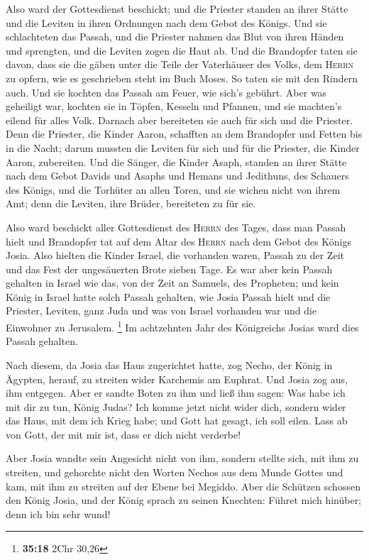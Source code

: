  Also ward der Gottesdienst beschickt; und die Priester
standen an ihrer Stätte und die Leviten in ihren Ordnungen nach dem
Gebot des Königs.  Und sie schlachteten das Passah, und
die Priester nahmen das Blut von ihren Händen und sprengten, und die
Leviten zogen die Haut ab.  Und die Brandopfer taten sie
davon, dass sie die gäben unter die Teile der Vaterhäuser des Volks, dem
\textsc{Herrn} zu opfern, wie es geschrieben steht im Buch Moses. So
taten sie mit den Rindern auch.  Und sie kochten das
Passah am Feuer, wie sich's gebührt. Aber was geheiligt war, kochten sie
in Töpfen, Kesseln und Pfannen, und sie machten's eilend für alles Volk.
 Darnach aber bereiteten sie auch für sich und die
Priester. Denn die Priester, die Kinder Aaron, schafften an dem
Brandopfer und Fetten bis in die Nacht; darum mussten die Leviten für
sich und für die Priester, die Kinder Aaron, zubereiten. 
Und die Sänger, die Kinder Asaph, standen an ihrer Stätte nach dem Gebot
Davids und Asaphs und Hemans und Jedithuns, des Schauers des Königs, und
die Torhüter an allen Toren, und sie wichen nicht von ihrem Amt; denn
die Leviten, ihre Brüder, bereiteten zu für sie.

 Also ward beschickt aller Gottesdienst des
\textsc{Herrn} des Tages, dass man Passah hielt und Brandopfer tat auf
dem Altar des \textsc{Herrn} nach dem Gebot des Königs Josia.
 Also hielten die Kinder Israel, die vorhanden waren,
Passah zu der Zeit und das Fest der ungesäuerten Brote sieben Tage.
 Es war aber kein Passah gehalten in Israel wie das, von
der Zeit an Samuels, des Propheten; und kein König in Israel hatte solch
Passah gehalten, wie Josia Passah hielt und die Priester, Leviten, ganz
Juda und was von Israel vorhanden war und die Einwohner zu Jerusalem.
\footnote{\textbf{35:18} 2Chr 30,26}  Im achtzehnten Jahr
des Königreichs Josias ward dies Passah gehalten.

 Nach diesem, da Josia das Haus zugerichtet hatte, zog
Necho, der König in Ägypten, herauf, zu streiten wider Karchemis am
Euphrat. Und Josia zog aus, ihm entgegen.  Aber er sandte
Boten zu ihm und ließ ihm sagen: Was habe ich mit dir zu tun, König
Judas? Ich komme jetzt nicht wider dich, sondern wider das Haus, mit dem
ich Krieg habe; und Gott hat gesagt, ich soll eilen. Lass ab von Gott,
der mit mir ist, dass er dich nicht verderbe!

 Aber Josia wandte sein Angesicht nicht von ihm, sondern
stellte sich, mit ihm zu streiten, und gehorchte nicht den Worten Nechos
aus dem Munde Gottes und kam, mit ihm zu streiten auf der Ebene bei
Megiddo.  Aber die Schützen schossen den König Josia, und
der König sprach zu seinen Knechten: Führet mich hinüber; denn ich bin
sehr wund!

